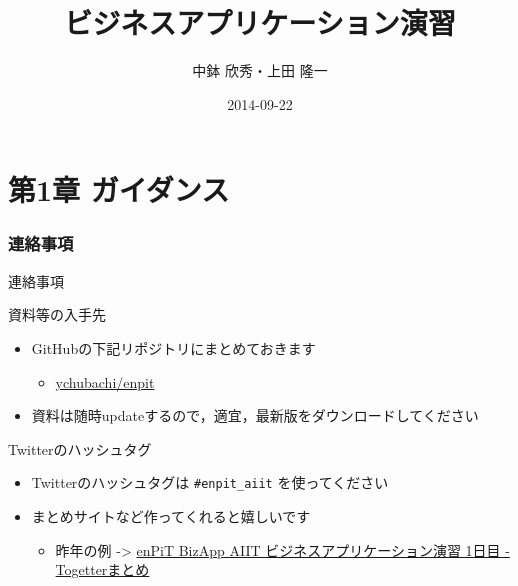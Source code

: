 \documentclass[t, aspectratio=169]{beamer}
\date{\insertpart}
\institute[AIIT]{産業技術大学院大学(AIIT)}
\author{中鉢 欣秀・上田 隆一}
\date{2014-09-22}
\title{ビジネスアプリケーション演習}
\begin{document}
\maketitle

\part{第1章 ガイダンス}
\label{sec-1}
\section{連絡事項}
\label{sec-1-1}
\begin{frame}[fragile,label=sec-1-1-1]{連絡事項}
 \begin{block}{資料等の入手先}
\begin{itemize}
\item GitHubの下記リポジトリにまとめておきます
\begin{itemize}
\item \href{https://github.com/ychubachi/enpit}{ychubachi/enpit}
\end{itemize}
\item 資料は随時updateするので，適宜，最新版をダウンロードしてください
\end{itemize}
\end{block}

\begin{block}{Twitterのハッシュタグ}
\begin{itemize}
\item Twitterのハッシュタグは \texttt{\#enpit\_aiit} を使ってください
\item まとめサイトなど作ってくれると嬉しいです
\begin{itemize}
\item 昨年の例 -> \href{http://togetter.com/li/558221}{enPiT BizApp AIIT ビジネスアプリケーション演習 1日目 - Togetterまとめ}
\end{itemize}
\end{itemize}
\end{block}
\end{frame}
\end{document}
